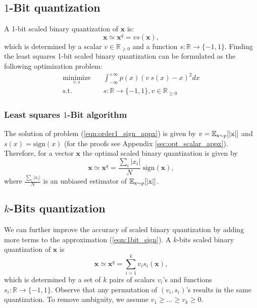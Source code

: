 \documentclass[10pt,twocolumn,letterpaper]{article}
\def\evx{{x}}
\def\rx{{\textnormal{x}}}
\def\vx{{\bm{x}}}
\newcommand{\R}{\mathbb{R}}
\newcommand{\E}{\mathbb{E}}
\begin{document}
\subsection{$1$-Bit quantization}\label{sec:1bit_quant}
A 1-bit scaled binary quantization of $\vx$ is:
\begin{equation} \label{eqn:1bit_sign}
	\vx \simeq \vx^q = v s(\vx),
\end{equation}
which is determined by a scalar $v \in \R_{\ge 0}$ and a function $s: \R \to \{-1,1\}$.
Finding the least squares 1-bit scaled binary quantization can be formulated as the following optimization problem:
\begin{equation}\label{eqn:order1_sign_appx}
    \begin{aligned}
        \underset{v,s}{\text{minimize}} \quad & \int_{-\infty}^{+\infty} p(x)(v~\!s(x) - x)^2 dx\\
        \text{s.t.} \quad & s: \R \to \{-1,1\}, v \in \R_{\ge 0}
    \end{aligned}
\end{equation}

\subsubsection{Least squares $1$-Bit algorithm}\label{sec:optimal_1bit_alg}
The solution of problem (\ref{eqn:order1_sign_appx}) is given by $v = \E_{\rx\sim p} [ |\rx| ]$ and $s(x) = \text{sign}(x)$ (for the proofs see Appendix \ref{sec:opt_scalar_appx}). Therefore, for a vector $\vx$ the optimal scaled binary quantization is given by
\begin{equation} \label{eqn:opt_order1_sign_appx}
	\vx \simeq \vx^q = \frac{\sum_{i} |\evx_i|}{N} ~\! \text{sign}(\vx),
\end{equation}
where $\frac{\sum_{i} |\evx_i|}{N}$ is an unbiased estimator of $\E_{\rx\sim p} [ |\rx| ]$.

\subsection{$k$-Bits quantization} \label{sec:scalar_sign_appx_high_order}
We can further improve the accuracy of scaled binary quantization by adding more terms to the approximation (\ref{eqn:1bit_sign}).
A $k$-bits scaled binary quantization of $\vx$ is 
\begin{equation}\label{eqn:kbit_representable}
	\vx \simeq \vx^q = \sum_{i=1}^k v_i s_i(\vx),
\end{equation}
which is determined by a set of  $k$ pairs of scalars $v_i$'s and functions $s_i: \R \to \{-1,1\}$. Observe that any permutation of $(v_i, s_i)$'s results in the same quantization. To remove ambiguity, we assume $v_1 \ge \ldots \ge v_k \ge 0$.
\end{document}
